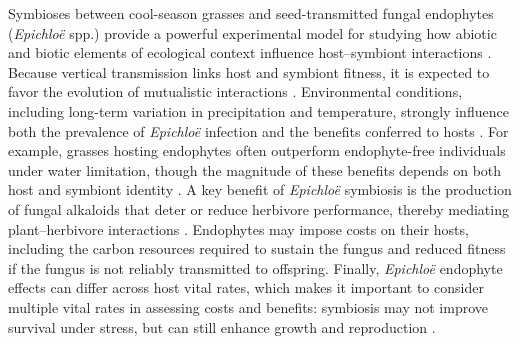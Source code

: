 \documentclass[12pt]{article}\usepackage[]{graphicx}\usepackage[dvipsnames]{xcolor}
\begin{document}
Symbioses between cool-season grasses and seed-transmitted fungal endophytes (\textit{Epichloë} spp.) provide a powerful experimental model for studying how abiotic and biotic elements of ecological context influence host–symbiont interactions \citep{schardl2004symbioses,saikkonen2010defensive,oberhofer2014effects,clay2005herbivores}. 
Because vertical transmission links host and symbiont fitness, it is expected to favor the evolution of mutualistic interactions \citep{gundel2024temporal,gundel2011incorporating}. 
Environmental conditions, including long-term variation in precipitation and temperature, strongly influence both the prevalence of \textit{Epichloë} infection and the benefits conferred to hosts \citep{rudgers2016long,fowler2025increasing}. 
For example, grasses hosting endophytes often outperform endophyte-free individuals under water limitation, though the magnitude of these benefits depends on both host and symbiont identity \citep{decunta2021systematic}. 
A key benefit of \textit{Epichloë}  symbiosis is the production of fungal alkaloids that deter or reduce herbivore performance, thereby mediating plant–herbivore interactions \citep{clay2005herbivores,saikkonen2010defensive}.
Endophytes may impose costs on their hosts, including the carbon resources required to sustain the fungus and reduced fitness if the fungus is not reliably transmitted to offspring.
Finally, \textit{Epichloë} endophyte effects can differ across host vital rates, which makes it important to consider multiple vital rates in assessing costs and benefits: symbiosis may not improve survival under stress, but can still enhance growth and reproduction \citep{yule2013costs,rudgers2012there}. 
\end{document}
